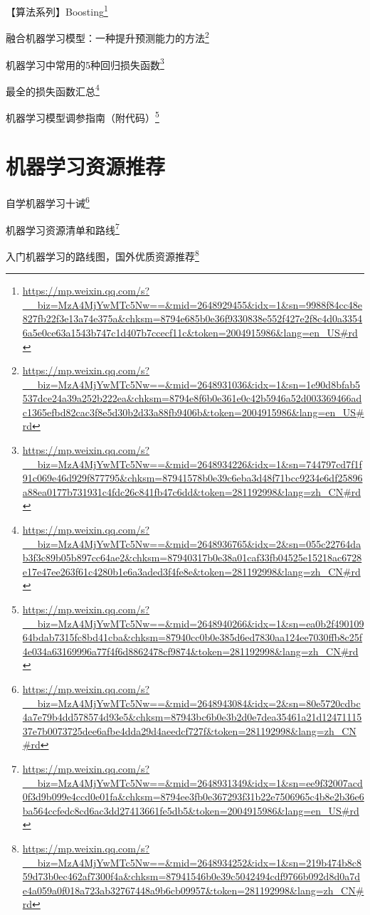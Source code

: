 \documentclass[]{ctexbook}
\renewcommand{\href}[2]{#2\footnote{\url{#1}}}
\begin{document}
\href{https://mp.weixin.qq.com/s?__biz=MzA4MjYwMTc5Nw==\&mid=2648929455\&idx=1\&sn=9988f84cc48e827fb22f3e13a74e375a\&chksm=8794e685b0e36f9330838e552f427e2f8c4d0a33546a5e0ce63a1543b747c1d407b7ccecf11c\&token=2004915986\&lang=en_US\#rd}{【算法系列】Boosting}

\href{https://mp.weixin.qq.com/s?__biz=MzA4MjYwMTc5Nw==\&mid=2648931036\&idx=1\&sn=1e90d8bfab5537dce24a39a252b222ea\&chksm=8794e8f6b0e361e0c42b5946a52d003369466adc1365efbd82cac3f8e5d30b2d33a88fb9406b\&token=2004915986\&lang=en_US\#rd}{融合机器学习模型：一种提升预测能力的方法}

\href{https://mp.weixin.qq.com/s?__biz=MzA4MjYwMTc5Nw==\&mid=2648934226\&idx=1\&sn=744797cd7f1f91c069e46d929f877795\&chksm=87941578b0e39c6eba3d48f71bcc9234e6df25896a88ea0177b731931c4fdc26c841fb47c6dd\&token=281192998\&lang=zh_CN\#rd}{机器学习中常用的5种回归损失函数}

\href{https://mp.weixin.qq.com/s?__biz=MzA4MjYwMTc5Nw==\&mid=2648936765\&idx=2\&sn=055c22764dab3f3c89b05b897cc64ae2\&chksm=87940317b0e38a01caf33fb04525e15218ac6728e17e47ee263f61c4280b1e6a3aded3f4fe8e\&token=281192998\&lang=zh_CN\#rd}{最全的损失函数汇总}

\href{https://mp.weixin.qq.com/s?__biz=MzA4MjYwMTc5Nw==\&mid=2648940266\&idx=1\&sn=ea0b2f49010964bdab7315fc8bd41cba\&chksm=87940cc0b0e385d6ed7830aa124ee7030ffb8c25f4e034a63169996a77f4f6d8862478cf9874\&token=281192998\&lang=zh_CN\#rd}{机器学习模型调参指南（附代码）}

\hypertarget{ux673aux5668ux5b66ux4e60ux8d44ux6e90ux63a8ux8350}{%
\section{机器学习资源推荐}\label{ux673aux5668ux5b66ux4e60ux8d44ux6e90ux63a8ux8350}}

\href{https://mp.weixin.qq.com/s?__biz=MzA4MjYwMTc5Nw==\&mid=2648943084\&idx=2\&sn=80e5720cdbc4a7e79b4dd578574d93e5\&chksm=87943bc6b0e3b2d0e7dea35461a21d1247111537e7b0073725dee6afbe4dda29d4aeedcf727f\&token=281192998\&lang=zh_CN\#rd}{自学机器学习十诫}

\href{https://mp.weixin.qq.com/s?__biz=MzA4MjYwMTc5Nw==\&mid=2648931349\&idx=1\&sn=ee9f32007acd0f3d9b099e4ccd0e01fa\&chksm=8794ee3fb0e367293f31b22e7506965c4b8e2b36e6ba564ccfedc8cd6ac3dd27413661fe5db5\&token=2004915986\&lang=en_US\#rd}{机器学习资源清单和路线}

\href{https://mp.weixin.qq.com/s?__biz=MzA4MjYwMTc5Nw==\&mid=2648934252\&idx=1\&sn=219b474b8c859d73b0ec462af7300f4a\&chksm=87941546b0e39c5042494cdf9766b092d8d0a7de4a059a0f018a723ab32767448a9b6cb09957\&token=281192998\&lang=zh_CN\#rd}{入门机器学习的路线图，国外优质资源推荐}
\end{document}
